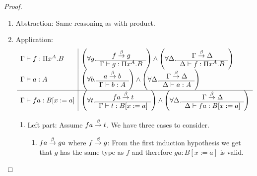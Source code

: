 \begin{theorem}
{\begin{proof}
\begin{enumerate}
\begin{enumerate}
\begin{enumerate}
                    In both cases we can derive from the induction hypotheses
                        either $\Gamma \vdash C: s_1$ or $\Gamma,x^A \vdash D:
                        s_2$. Therefore $\Gamma \vdash \Pi x^C. B: s_2$ or $\Gamma
                        \vdash \Pi x^A.D: s_2$ is valid trivially.

                    \item Right part: Assume $\Gamma \reduce \Delta$. From the
                        first induction hypothesis we get $\Delta \vdash A:
                        s_1$. From the second induction hypothesis we get
                        $\Delta, x^A \vdash B: s_2$ where we use $\Delta' =
                        \Delta, x^A$. These facts imply $\Delta
                        \vdash \Pi x^A. B : s_2$.
                \end{enumerate}

                \item Abstraction: Same reasoning as with product.

                \item Application:
                $$
                \begin{array}{l|l}
                    \Gamma \vdash f: \Pi x^A. B
                    &
                    \left( \forall g. \begin{array}{c} f \stackrel{\beta}{\to} g \\ \hline \Gamma \vdash g: \Pi x^A. B\end{array} \right)
                    \land
                    \left( \forall \Delta. \begin{array}{c} \Gamma \stackrel{\beta}{\to} \Delta \\ \hline \Delta \vdash f: \Pi x^A.B\end{array} \right)
                    \\
                    \Gamma \vdash a: A
                    &
                    \left( \forall b. \begin{array}{c} a \stackrel{\beta}{\to} b \\ \hline \Gamma \vdash b: A\end{array} \right)
                    \land
                    \left( \forall \Delta. \begin{array}{c} \Gamma \stackrel{\beta}{\to} \Delta \\ \hline \Delta \vdash a: A\end{array} \right)
                    \\
                    \hline
                    \Gamma \vdash f a: B[x:=a]
                    &
                    \left( \forall t. \begin{array}{c} f a \stackrel{\beta}{\to} t \\ \hline \Gamma \vdash t: B[x:=a]\end{array} \right)
                    \land
                    \left( \forall \Delta. \begin{array}{c} \Gamma \stackrel{\beta}{\to} \Delta \\ \hline \Delta \vdash f a: B[x:=a]\end{array} \right)
                \end{array}
                $$
                \begin{enumerate}
                    \item Left part: Assume $f a \stackrel{\beta}{\to} t$. We have three cases
                        to consider.
                    \begin{enumerate}
                        \item $f a \stackrel{\beta}{\to} g a$ where $f \stackrel{\beta}{\to} g$: From the
                            first induction hypothesis we get that $g$ has the
                            same type as $f$ and therefore $g a: B[x:=a]$ is
                            valid.


\end{enumerate}
\end{enumerate}
\end{enumerate}
\end{enumerate}
\end{proof}}
\end{theorem}

